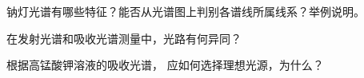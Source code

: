 \documentclass[dvipsnames, svgnames,a4paper,11pt]{article}
\begin{document}
\begin{question}
	 钠灯光谱有哪些特征？能否从光谱图上判别各谱线所属线系？举例说明。
\end{question}
	
	
	
	
	
\begin{question}
	在发射光谱和吸收光谱测量中，光路有何异同？
\end{question}
	
	
	
	
	
	
	
\begin{question}
	根据高锰酸钾溶液的吸收光谱， 应如何选择理想光源，为什么？
\end{question}
	
	
	
	
	
	
	
	
	
	
	
	
	
	
	
%
%

%		
%		
%		
%		
\end{document}
